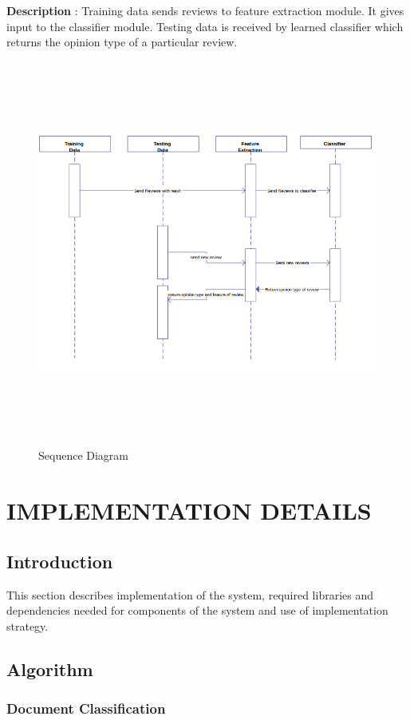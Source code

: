 \documentclass[oneside,a4paper,12pt]{pictreport}
\begin{document}
\textbf{Description} : Training data sends reviews to feature extraction module.
It gives input to the classifier module. Testing data is received by learned classifier which 
returns the opinion type of a particular review.
\vspace{4mm}
\begin{figure}[h!]
\includegraphics[width=6.0in,height=5.0in]{sequence.png}
\caption{Sequence Diagram}
\end{figure}

\chapter{IMPLEMENTATION DETAILS}
\section{Introduction}
This section describes implementation of the system, required libraries and dependencies needed for components of the system and use of implementation strategy.
\section{Algorithm}
\subsection{Document Classification}
\end{document}
